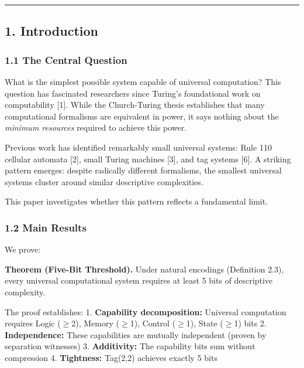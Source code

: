\documentclass[
  11pt,
]{article}
\begin{document}
\begin{center}\rule{0.5\linewidth}{0.5pt}\end{center}

\hypertarget{introduction}{%
\subsection{1. Introduction}\label{introduction}}

\hypertarget{the-central-question}{%
\subsubsection{1.1 The Central Question}\label{the-central-question}}

What is the simplest possible system capable of universal computation?
This question has fascinated researchers since Turing's foundational
work on computability {[}1{]}. While the Church-Turing thesis
establishes that many computational formalisms are equivalent in power,
it says nothing about the \emph{minimum resources} required to achieve
this power.

Previous work has identified remarkably small universal systems: Rule
110 cellular automata {[}2{]}, small Turing machines {[}3{]}, and tag
systems {[}6{]}. A striking pattern emerges: despite radically different
formalisms, the smallest universal systems cluster around similar
descriptive complexities.

This paper investigates whether this pattern reflects a fundamental
limit.

\hypertarget{main-results}{%
\subsubsection{1.2 Main Results}\label{main-results}}

We prove:

\textbf{Theorem (Five-Bit Threshold).} Under natural encodings
(Definition 2.3), every universal computational system requires at least
5 bits of descriptive complexity.

The proof establishes: 1. \textbf{Capability decomposition:} Universal
computation requires Logic ($\geq$2), Memory ($\geq$1), Control ($\geq$1), State ($\geq$1)
bits 2. \textbf{Independence:} These capabilities are mutually
independent (proven by separation witnesses) 3. \textbf{Additivity:} The
capability bits sum without compression 4. \textbf{Tightness:} Tag(2,2)
achieves exactly 5 bits
\end{document}
